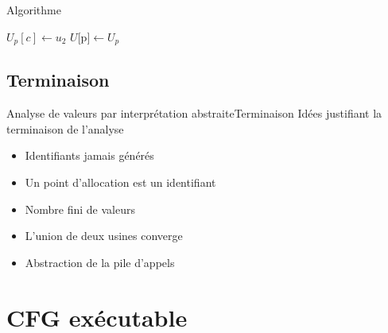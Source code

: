 \documentclass{beamer}
\begin{document}
\begin{frame}{Algorithme}
\begin{algorithm}[H]
{{{{                    $U_p[c] \gets u_2$ 
                    $U[$p$] \gets U_p$ 
        
                    \BlankLine
                     
                 }
              }{
              }
           }{
           }
        }
        \caption{Analyse du programme}
    \end{algorithm}
\end{frame}
\fi

\subsection{Terminaison}

\begin{frame}{Analyse de valeurs par interprétation abstraite}{Terminaison}
    Idées justifiant la terminaison de l'analyse

    \begin{itemize}
        \item Identifiants jamais générés
        \item Un point d'allocation est un identifiant
        \item Nombre fini de valeurs
        \item L'union de deux usines converge
        \item Abstraction de la pile d'appels
    \end{itemize}
\end{frame}





\section{CFG exécutable}
\end{document}
